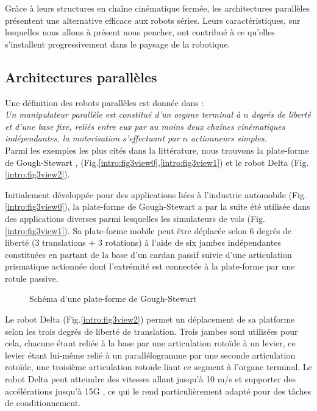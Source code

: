 Grâce à leurs structures en cha\^ine cin\'ematique ferm\'ee, les 
architectures parallèles pr\'esentent une alternative efficace aux robots 
s\'eries.  Leurs caractéristiques, sur lesquel\-les nous allons \`a 
pr\'esent nous pencher, ont contribué à ce qu'elles s'installent 
progressivement dans le paysage de la robotique.

\subsection{Architectures parallèles} \label{chap0-0-2}

Une définition des robots parallèles est donnée dans \cite{merlet1997robots} :\\
{\it Un manipulateur parallèle est constitué d’un organe terminal à $n$ degrés 
de li\-berté et d’une base fixe, reliés entre eux par au moins deux chaînes
cinématiques indépendantes, la motorisation s’effectuant par $n$ actionneurs 
simples.}\\

Parmi les exemples les plus cités dans la littérature, nous trouvons 
la plate-forme de Gough-Stewart \cite{1956:Gough}, \cite{1965:Stewart} 
(Fig.\ref{intro:fig3view0},\ref{intro:fig3view1}) et le robot Delta 
\cite{1988:Clavel} (Fig.\ref{intro:fig3view2}).

Initialement développée pour des applications li\'ees \`a l'industrie 
automobile (Fig.\ref{intro:fig3view0}), la plate-forme de Gough-Stewart a par 
la suite été utilisée dans des applications diverses parmi lesquelles les 
simulateurs de vols (Fig.\ref{intro:fig3view1}). Sa plate-forme mobile peut 
être déplacée selon 6 degrés de liberté (3 translations $+$ 3 rotations) à 
l'aide de six jambes indépendantes constitu\'ees en partant de la 
base d'un cardan passif suivie d'une articulation prismatique 
actionn\'ee dont l'extr\'emit\'e est connect\'ee \`a la plate-forme 
par une rotule passive.

\begin{figure}[!ht]
  \centering
\def\svgwidth{.85\linewidth}

    \caption{\footnotesize{Sch\'ema d'une plate-forme de Gough-Stewart}}
\label{intro:fig2b}
\end{figure}

Le robot Delta (Fig.\ref{intro:fig3view2}) permet un déplacement de sa 
platforme selon les trois degrés de liberté de translation. Trois jambes sont 
utilisées pour cela, chacune étant reliée à la base par une articulation rotoïde 
à un levier, ce levier étant lui-même relié à un parallélogramme par une 
seconde articulation rotoïde, une troisième articulation rotoïde liant ce 
segment à l'organe terminal. Le robot Delta peut atteindre des vitesses allant 
jusqu'à 10 m/s et supporter des accélérations jusqu'à 15G \cite{park2013}, ce 
qui le rend particulièrement adapté pour des tâches de conditionnement.

